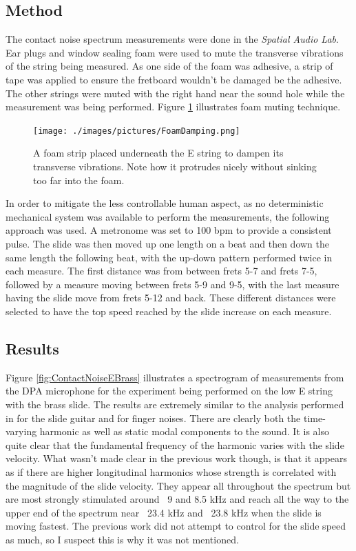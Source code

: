 \documentclass[../main.tex]{subfiles}
\begin{document}
\subsection{Method}
The contact noise spectrum measurements were done in the \emph{Spatial Audio Lab}. Ear plugs and window sealing foam were used to mute the transverse vibrations of the string being measured. As one side of the foam was adhesive, a strip of tape was applied to ensure the fretboard wouldn't be damaged be the adhesive. The other strings were muted with the right hand near the sound hole while the measurement was being performed. Figure \ref{fig:FoamStrip} illustrates foam muting technique.

\begin{figure}[h]
    \centering
    \texttt{[image: ./images/pictures/FoamDamping.png]}
    \caption{A foam strip placed underneath the E string to dampen its transverse vibrations. Note how it protrudes nicely without sinking too far into the foam.}
    \label{fig:FoamStrip}
\end{figure}

In order to mitigate the less controllable human aspect, as no deterministic mechanical system was available to perform the measurements, the following approach was used. A metronome was set to 100 bpm to provide a consistent pulse. The slide was then moved up one length on a beat and then down the same length the following beat, with the up-down pattern performed twice in each measure. The first distance was from between frets 5-7 and frets 7-5, followed by a measure moving between frets 5-9 and 9-5, with the last measure having the slide move from frets 5-12 and back. These different distances were selected to have the top speed reached by the slide increase on each measure.

\subsection{Results}
Figure \ref{fig:ContactNoiseEBrass} illustrates a spectrogram of  measurements from the DPA microphone for the experiment being performed on the low E string with the brass slide. The results are extremely similar to the analysis performed in  for the slide guitar and  for finger noises. There are clearly both the time-varying harmonic as well as static modal components to the sound. It is also quite clear that the fundamental frequency of the harmonic varies with the slide velocity. What wasn't made clear in the previous work though, is that it appears as if there are higher longitudinal harmonics whose strength is correlated with the magnitude of the slide velocity. They appear all throughout the spectrum but are most strongly stimulated around ~9 and 8.5 kHz and reach all the way to the upper end of the spectrum near ~23.4 kHz and ~23.8 kHz when the slide is moving fastest. The previous work did not attempt to control for the slide speed as much, so I suspect this is why it was not mentioned.
\end{document}
